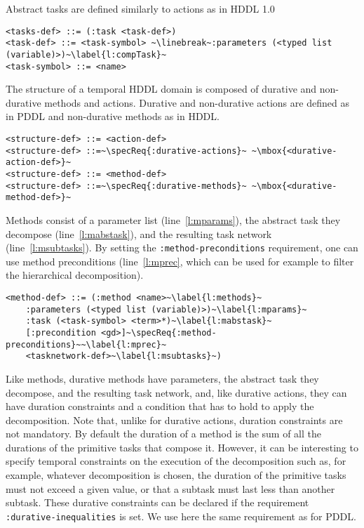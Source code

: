 \documentclass{article}
\begin{document}
%
%
\noindent Abstract tasks are defined similarly to actions as in HDDL 1.0
\begin{lstlisting}[firstnumber=last, escapechar=~]
<tasks-def> ::= (:task <task-def>)
<task-def> ::= <task-symbol> ~\linebreak~:parameters (<typed list (variable)>)~\label{l:compTask}~
<task-symbol> ::= <name>
\end{lstlisting}

\noindent The structure of a temporal HDDL domain is composed of durative and non-durative methods and actions. Durative and non-durative actions are defined as in PDDL and non-durative methods as in HDDL. 

\begin{lstlisting}[firstnumber=last, escapechar=~]
<structure-def> ::= <action-def>
<structure-def> ::=~\specReq{:durative-actions}~ ~\mbox{<durative-action-def>}~
<structure-def> ::= <method-def>
<structure-def> ::=~\specReq{:durative-methods}~ ~\mbox{<durative-method-def>}~
\end{lstlisting}

%
%
Methods consist of a parameter list (line~\ref{l:mparams}), the abstract task they decompose (line~\ref{l:mabstask}), and the resulting task network (line~\ref{l:msubtasks}). By setting the \verb+:method-preconditions+ requirement, one can use method preconditions (line~\ref{l:mprec}, which can be used for example to filter the hierarchical decomposition).

\begin{lstlisting}[firstnumber=last, escapechar=~]
<method-def> ::= (:method <name>~\label{l:methods}~
    :parameters (<typed list (variable)>)~\label{l:mparams}~
    :task (<task-symbol> <term>*)~\label{l:mabstask}~
    [:precondition <gd>]~\specReq{:method-preconditions}~~\label{l:mprec}~
    <tasknetwork-def>~\label{l:msubtasks}~)
\end{lstlisting}

%
%
Like methods, durative methods have parameters, the abstract task they decompose, and the resulting task network, and, like durative actions, they can have duration constraints and a condition that has to hold to apply the decomposition. Note that, unlike for durative actions, duration constraints are not mandatory. By default the duration of a method is the sum of all the durations of the primitive tasks that compose it. However, it can be interesting to specify temporal constraints on the execution of the decomposition such as, for example, whatever decomposition is chosen, the duration of the primitive tasks must not exceed a given value, or that a subtask must last less than another subtask. These durative constraints can be declared if the requirement {\tt :durative-inequalities} is set. We use here the same requirement as for PDDL.
\end{document}
